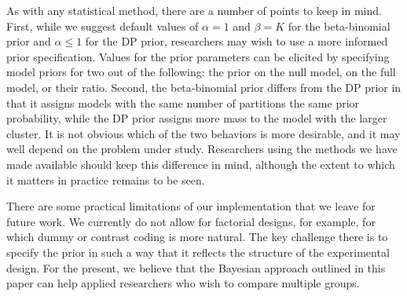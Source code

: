 \documentclass[11pt,a4paper]{article}
\theoremstyle{definition} %
\theoremstyle{case}
\newcommand{\FD}[1]{\textcolor{red}{Fabian: #1 }}
\begin{document}

As with any statistical method, there are a number of points to keep in mind. First, while we suggest default values of $\alpha = 1$ and $\beta = K$ for the beta-binomial prior and $\alpha \leq 1$ for the DP prior, researchers may wish to use a more informed prior specification. Values for the prior parameters can be elicited by specifying model priors for two out of the following: the prior on the null model, on the full model, or their ratio. Second, the beta-binomial prior differs from the DP prior in that it assigns models with the same number of partitions the same prior probability, while the DP prior assigns more mass to the model with the larger cluster. It is not obvious which of the two behaviors is more desirable, and it may well depend on the problem under study. Researchers using the methods we have made available should keep this difference in mind, although the extent to which it matters in practice remains to be seen.


There are some practical limitations of our implementation that we leave for future work. We currently do not allow for factorial designs, for example, for which dummy or contrast coding is more natural. The key challenge there is to specify the prior in such a way that it reflects the structure of the experimental design. For the present, we believe that the Bayesian approach outlined in this paper can help applied researchers who wish to compare multiple groups.

\end{document}
